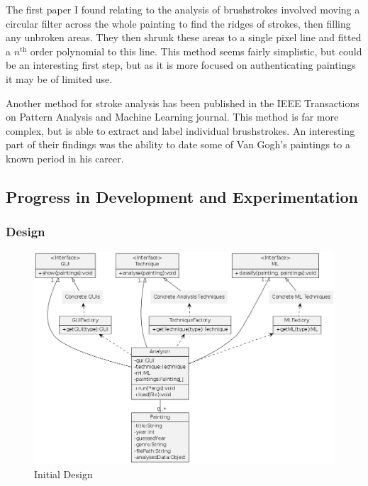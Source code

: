 \documentclass[11pt,fleqn,twoside]{article}
\begin{document}
The first paper I found relating to the analysis of brushstrokes involved moving a circular filter
across the whole painting to find the ridges of strokes, then filling any unbroken areas. They then
shrunk these areas to a single pixel line and fitted a $n^{\text{th}}$ order polynomial to this
line\cite{Berezhnoy2005Authentic}. This method seems fairly simplistic, but could be an interesting
first step, but as it is more focused on authenticating paintings it may be of limited use.

Another method for stroke analysis has been published in the IEEE Transactions on Pattern Analysis
and Machine Learning journal. This method is far more complex, but is able to extract and label
individual brushstrokes. An interesting part of their findings was the ability to date some of Van
Gogh's paintings to a known period in his career\cite{Li2012Rhythmic}.

\clearpage
\subsection{Progress in Development and Experimentation}

\subsubsection{Design}
\begin{figure}[H]
\includegraphics[scale=0.5]{img/design.png}
\caption{Initial Design}
\label{fig:init-class}
\end{figure}
\end{document}
